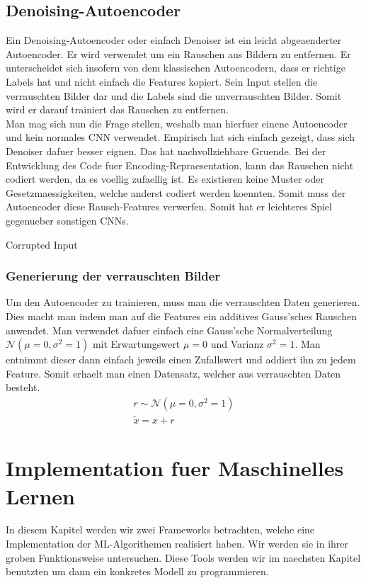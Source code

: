 \section{Denoising-Autoencoder}
Ein Denoising-Autoencoder oder einfach Denoiser ist ein leicht abgeaenderter
Autoencoder. Er wird verwendet um ein Rauschen aus Bildern zu entfernen.
\para{}
Er unterscheidet sich insofern von dem klassischen Autoencodern, dass er
richtige Labels hat und nicht einfach die Features kopiert. Sein Input stellen
die verrauschten Bilder dar und die Labels sind die unverrauschten Bilder. Somit
wird er darauf trainiert das Rauschen zu entfernen. \\
Man mag sich nun die Frage stellen, weshalb man hierfuer einene Autoencoder und
kein normales CNN verwendet. Empirisch hat sich einfach gezeigt, dass sich
Denoiser dafuer besser eignen. Das hat nachvollziehbare Gruende. Bei der
Entwicklung des Code fuer Encoding-Repraesentation, kann das Rauschen nicht
codiert werden, da es voellig zufaellig ist. Es existieren keine Muster oder
Gesetzmaessigkeiten, welche anderst codiert werden koennten. Somit muss der
Autoencoder diese Rausch-Features verwerfen. Somit hat er leichteres Spiel
gegenueber sonstigen CNNs.

Corrupted Input
\subsection{Generierung der verrauschten Bilder}
Um den Autoencoder zu trainieren, muss man die verrauschten Daten generieren.
Dies macht man indem man auf die Features ein additives Gauss'sches Rauschen anwendet.
Man verwendet dafuer einfach eine Gauss'sche Normalverteilung
$\mathcal{N}(\mu = 0, \sigma^2 = 1)$ mit Erwartungswert $\mu = 0$ und Varianz
$\sigma^2 = 1$. Man entnimmt dieser dann einfach jeweils einen Zufallswert und
addiert ihn zu jedem Feature. Somit erhaelt man einen Datensatz, welcher aus
verrauschten Daten besteht.
\begin{gather*}
  r \sim \mathcal{N}(\mu = 0, \sigma^2 = 1) \\
  \tilde{x} = x + r
\end{gather*}



\chapter{Implementation fuer Maschinelles Lernen}
In diesem Kapitel werden wir zwei Frameworks betrachten, welche eine
Implementation der ML-Algorithemen realisiert haben. Wir werden sie in ihrer
groben Funktionsweise untersuchen. Diese Tools werden wir im
naechsten Kapitel benutzten um dann ein konkretes Modell zu programmieren.

